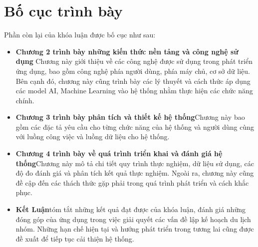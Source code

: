 \section{Bố cục trình bày}
Phần còn lại của khóa luận được bố cục như sau: 
\begin{itemize}
    \item \textbf{Chương 2 trình bày những kiến thức nền tảng và công nghệ sử dụng}\nl
    Chương này giới thiệu về các công nghệ được sử dụng trong phát triển ứng dụng, bao gồm công nghệ phía người dùng, phía máy chủ, cơ sở dữ liệu. Bên cạnh đó, chương này cũng trình bày các lý thuyết và cách thức áp dụng các model AI, Machine Learning vào hệ thống nhằm thực hiện các chức năng chính.
    
    \item \textbf{Chương 3 trình bày phân tích và thiết kế hệ thống}\nl Chương này bao gồm các đặc tả yêu cầu cho từng chức năng của hệ thống và người dùng cùng với luồng công việc và luồng dữ liệu cho hệ thống.
    
    \item \textbf{Chương 4 trình bày về quá trình triển khai và đánh giá hệ thống}\nl Chương này mô tả chi tiết quy trình thực nghiệm, dữ liệu sử dụng, các độ đo đánh giá và phân tích kết quả thực nghiệm. Ngoài ra, chương này cũng đề cập đến các thách thức gặp phải trong quá trình phát triển và cách khắc phục.
    
    \item \textbf{Kết Luận}\nl tóm tắt những kết quả đạt được của khóa luận, đánh giá những đóng góp của ứng dụng trong việc giải quyết các vấn đề lập kế hoạch du lịch nhóm. Những hạn chế hiện tại và hướng phát triển trong tương lai cũng được đề xuất để tiếp tục cải thiện hệ thống.
\end{itemize}